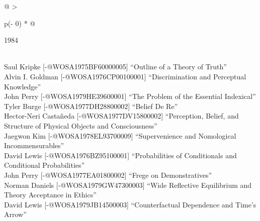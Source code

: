 \documentclass[
  10pt,
  letterpaper,
  DIV=11,
  numbers=noendperiod,
  twoside]{scrartcl}
\begin{document}
\begin{longtable}[]{@{}
  >{\raggedright\arraybackslash}p{(\columnwidth - 0\tabcolsep) * }@{}}

\caption{\label{tbl-top-ten-1975}Most cited articles published less than
ten years ago as of 1984.}

\tabularnewline

\toprule\noalign{}
\begin{minipage}[b]{\linewidth}\raggedright
1984
\end{minipage} \\
\midrule\noalign{}
\endhead
\bottomrule\noalign{}
\endlastfoot
Saul Kripke {[}-@WOSA1975BF60000005{]} ``Outline of a Theory of
Truth'' \\
Alvin I. Goldman {[}-@WOSA1976CP00100001{]} ``Discrimination and
Perceptual Knowledge'' \\
John Perry {[}-@WOSA1979HE39600001{]} ``The Problem of the Essential
Indexical'' \\
Tyler Burge {[}-@WOSA1977DH28800002{]} ``Belief De Re'' \\
Hector-Neri Castañeda {[}-@WOSA1977DV15800002{]} ``Perception, Belief,
and Structure of Physical Objects and Consciousness'' \\
Jaegwon Kim {[}-@WOSA1978EL93700009{]} ``Supervenience and Nomological
Incommensurables'' \\
David Lewis {[}-@WOSA1976BZ95100001{]} ``Probabilities of Conditionals
and Conditional Probabilities'' \\
John Perry {[}-@WOSA1977EA01800002{]} ``Frege on Demonstratives'' \\
Norman Daniels {[}-@WOSA1979GW47300003{]} ``Wide Reflective Equilibrium
and Theory Acceptance in Ethics'' \\
David Lewis {[}-@WOSA1979JB14500003{]} ``Counterfactual Dependence and
Time's Arrow'' \\

\end{longtable}
\end{document}
